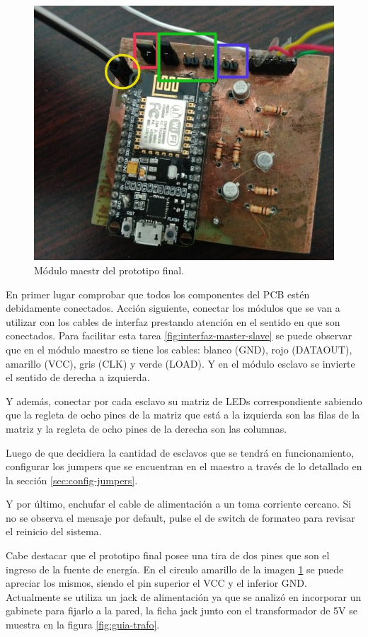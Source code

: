 \begin{figure}[!ht]
	\centering
	\includegraphics[width=0.8\linewidth]{imagenes/guia/master-rec.jpg}
	\caption{Módulo maestr del prototipo final.}
	\label{fig:guia-master}
\end{figure}

En primer lugar comprobar que todos los componentes del PCB estén debidamente conectados. Acción siguiente, conectar los módulos que se van a utilizar con los cables de interfaz prestando atención en el sentido en que son conectados.
Para facilitar esta tarea \ref{fig:interfaz-master-slave} se puede observar que en el módulo maestro se tiene los cables: blanco (GND), rojo (DATAOUT), amarillo (VCC), gris (CLK) y verde (LOAD). Y en el módulo esclavo se invierte el sentido de derecha a izquierda.

Y además, conectar por cada esclavo su matriz de LEDs correspondiente sabiendo que la regleta de ocho pines de la matriz que está a la izquierda son las filas de la matriz y la regleta de ocho pines de la derecha son las columnas.

Luego de que decidiera la cantidad de esclavos que se tendrá en funcionamiento, configurar los jumpers que se encuentran en el maestro a través de lo detallado en la sección \ref{sec:config-jumpers}.

Y por último, enchufar el cable de alimentación a un toma corriente cercano. Si no se observa el mensaje por default, pulse el de switch de formateo para revisar el reinicio del sistema.

Cabe destacar que el prototipo final posee una tira de dos pines que son el ingreso de la fuente de energía. En el circulo amarillo de la imagen \ref{fig:guia-master} se puede apreciar los mismos, siendo el pin superior el VCC y el inferior GND. Actualmente se utiliza un jack de alimentación ya que se analizó en incorporar un gabinete para fijarlo a la pared, la ficha jack junto con el transformador de 5V se muestra en la figura \ref{fig:guia-trafo}.

